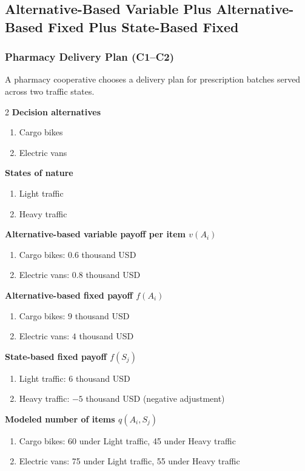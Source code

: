 	\subsection{Alternative-Based Variable Plus Alternative-Based Fixed Plus State-Based Fixed}
	\label{sec:alternative-based-variable-payoff-plus-alternative-based-fixed-payoff-plus-state-based-fixed-payoff}


	\subsubsection{Pharmacy Delivery Plan (C1--C2)}
	\label{sec:problem30-pharmacy-delivery-plan-c1-c2}
	A pharmacy cooperative chooses a delivery plan for prescription batches served across two traffic states.
	\begin{multicols}{2}
	\textbf{Decision alternatives}
	\begin{enumerate}[label=\arabic*.]
\item Cargo bikes
\item Electric vans
	\end{enumerate}
	\textbf{States of nature}
	\begin{enumerate}[label=\arabic*.]
\item Light traffic
\item Heavy traffic
	\end{enumerate}
	\columnbreak
	\textbf{Alternative-based variable payoff per item $v(A_i)$}
\begin{enumerate}[label=\arabic*.]
\item Cargo bikes: $0.6$ thousand USD
\item Electric vans: $0.8$ thousand USD\end{enumerate}
\textbf{Alternative-based fixed payoff $f(A_i)$}
\begin{enumerate}[label=\arabic*.]
\item Cargo bikes: $9$ thousand USD
\item Electric vans: $4$ thousand USD\end{enumerate}
\textbf{State-based fixed payoff $f(S_j)$}
\begin{enumerate}[label=\arabic*.]
\item Light traffic: $6$ thousand USD
\item Heavy traffic: $-5$ thousand USD (negative adjustment)\end{enumerate}
\textbf{Modeled number of items $q(A_i,S_j)$}
\begin{enumerate}[label=\arabic*.]
\item Cargo bikes: 60 under Light traffic, 45 under Heavy traffic
\item Electric vans: 75 under Light traffic, 55 under Heavy traffic
\end{enumerate}
	\end{multicols}

